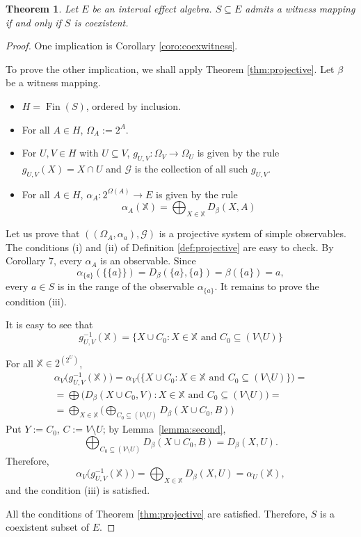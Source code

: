 \documentclass[letterpaper]{amsart}
\newtheorem{theorem}{Theorem}
\theoremstyle{definition}
\DeclareMathOperator*\Fin{Fin}
\begin{document}
\begin{theorem}
\label{thm:main}
Let $E$ be an interval effect algebra. $S\subseteq E$ admits a witness
mapping if and only if $S$ is coexistent.
\end{theorem}
\begin{proof}
One implication is Corollary \ref{coro:coexwitness}.

To prove the other implication, we shall apply Theorem \ref{thm:projective}.
Let $\beta$ be a witness mapping.
\begin{itemize}
\item $H=\Fin(S)$, ordered by inclusion.
\item For all $A\in H$, $\Omega_A:=2^A$.
\item For $U,V\in H$ with $U\subseteq V$, $g_{U,V}:\Omega_{V}\to\Omega_{U}$
is given by the rule
$g_{U,V}(X)=X\cap U$ and $\mathcal G$ is the collection of all such $g_{U,V}$.
\item For all $A\in H$, $\alpha_A:2^{\Omega(A)}\to E$ is given by the
rule
$$
\alpha_A(\mathbb X)=\bigoplus_{X\in\mathbb X}D_\beta(X,A)
$$
\end{itemize}

Let us prove that 
$((\Omega_A,\alpha_a),\mathcal G)$ is a projective system of simple observables.
The conditions (i) and (ii) of Definition \ref{def:projective} are easy to check.
By Corollary 7, every $\alpha_A$ is an observable.
Since
$$
\alpha_{\{a\}}(\{\{a\}\})=D_\beta(\{a\},\{a\})=\beta(\{a\})=a,
$$
every $a\in S$ is in the range of the observable 
$\alpha_{\{a\}}$.
It remains to prove the condition (iii).

It is easy to see that
$$
g_{U,V}^{-1}(\mathbb X)=\{X\cup C_0:X\in\mathbb X
	\text{ and }C_0\subseteq (V\setminus U)\}
$$

For all $\mathbb X\in 2^{(2^U)}$,
\begin{align*}
\alpha_V\bigl(g_{U,V}^{-1}(\mathbb X)\bigr)=
	\alpha_V\bigl(\{X\cup C_0:X\in\mathbb X
	\text{ and }C_0\subseteq (V\setminus U)\}\bigr)=\\
=\bigoplus\bigl(
	D_\beta(X\cup C_0,V):X\in\mathbb X
	\text{ and }C_0\subseteq (V\setminus U)
	\bigr)=\\
=\bigoplus_{X\in\mathbb X}\bigl(
\bigoplus_{C_0\subseteq (V\setminus U)}
D_\beta(X\cup C_0,B)\bigr)
\end{align*}
Put $Y:=C_0$, $C:=V\setminus U$; by Lemma~\ref{lemma:second},
$$
\bigoplus_{C_0\subseteq (V\setminus U)}
D_\beta(X\cup C_0,B)=D_\beta(X,U).
$$
Therefore,
$$
\alpha_V\bigl(g_{U,V}^{-1}(\mathbb X)\bigr)=\bigoplus_{X\in\mathbb X} D_\beta(X,U)=
\alpha_U(\mathbb X),
$$
and the condition (iii) is satisfied.

All the conditions of Theorem \ref{thm:projective} are satisfied. Therefore,
$S$ is a coexistent subset of $E$.
\end{proof}
\end{document}
